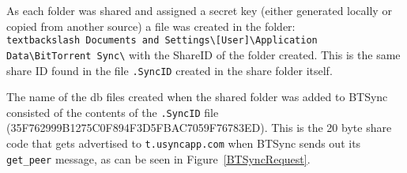 \documentclass[final,5p,times,twocolumn]{elsarticle}
\begin{document}
As each folder was shared and assigned a secret key (either generated locally or copied from another source) a file was created in the folder:
\texttt{\\textbackslash Documents and Settings\textbackslash [User]\textbackslash Application Data\textbackslash BitTorrent Sync\textbackslash} with the ShareID of the folder created. This is the same share ID found in the file \texttt{.SyncID} created in the share folder itself.

The name of the db files created when the shared folder was added to BTSync consisted of the contents of the \texttt{.SyncID} file (35F762999B1275C0F894F3D5FBAC7059F76783ED). This is the 20 byte share code that gets advertised to \texttt{t.usyncapp.com} when BTSync sends out its \texttt{get\_peer} message, as can be seen in Figure~\ref{BTSyncRequest}. 
\end{document}
